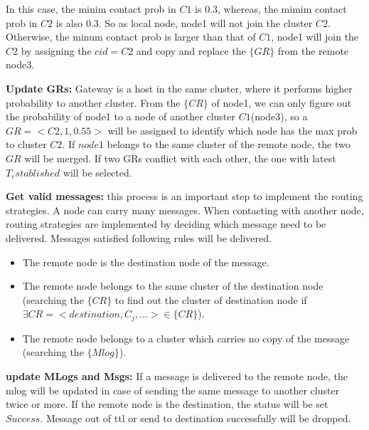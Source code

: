 In this case, the minim contact prob in $C1$ is 0.3, whereas, the mimim contact prob in $C2$ is also 0.3. So as local node, node1 will not join the cluster $C2$. Otherwise, the minum contact prob is larger than that of $C1$, node1 will join the $C2$ by assigning the $cid=C2$ and copy and replace the $\{GR\}$ from the remote node3.

\textbf{Update GRs:} Gateway is a host in the same cluster, where it performs higher probability to another cluster. From the $\{CR\}$ of node1, we can only figure out the probability of node1 to a node of another cluster $C1$(node3), so a $GR=<C2,1,0.55>$ will be assigned to identify which node has the max prob to cluster $C2$. If $node1$ belongs to the same cluster of the remote node, the two $GR$ will be merged. If two GRs conflict with each other, the one with latest $T_established$ will be selected.

\textbf{Get valid messages:} this process is an important step to implement the routing strategies. A node can carry many messages. When contacting with another node, routing strategies are implemented by deciding which message need to be delivered. Messages satisfied following rules will be delivered.
\begin{itemize}
  \item The remote node is the destination node of the message.
  \item The remote node belongs to the same cluster of the destination node (searching the $\{CR\}$ to find out the cluster of destination node if $\exists CR=<destination,C_j,...>\in\{CR\}$).
  \item The remote node belongs to a cluster which carries no copy of the message (searching the $\{Mlog\}$).
\end{itemize}

\textbf{update MLogs and Msgs:} If a message is delivered to the remote node, the mlog will be updated in case of sending the same message to another cluster twice or more. If the remote node is the destination, the status will be set $Success$. Message out of ttl or send to destination successfully will be dropped.
